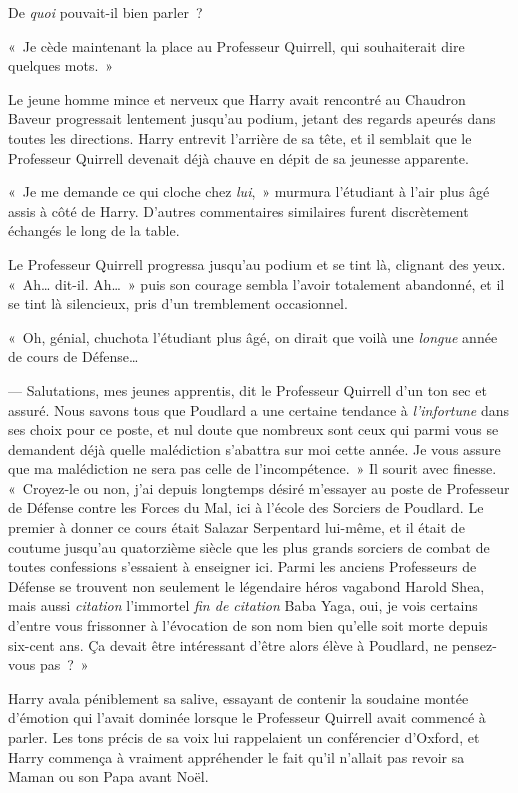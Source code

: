 De \emph{quoi} pouvait-il bien parler~?

«~Je cède maintenant la place au Professeur Quirrell, qui souhaiterait dire quelques mots.~»

Le jeune homme mince et nerveux que Harry avait rencontré au Chaudron Baveur progressait lentement jusqu'au podium, jetant des regards apeurés dans toutes les directions. Harry entrevit l'arrière de sa tête, et il semblait que le Professeur Quirrell devenait déjà chauve en dépit de sa jeunesse apparente.

«~Je me demande ce qui cloche chez \emph{lui},~» murmura l'étudiant à l'air plus âgé assis à côté de Harry. D'autres commentaires similaires furent discrètement échangés le long de la table.

Le Professeur Quirrell progressa jusqu'au podium et se tint là, clignant des yeux. «~Ah… dit-il. Ah…~» puis son courage sembla l'avoir totalement abandonné, et il se tint là silencieux, pris d'un tremblement occasionnel.

«~Oh, génial, chuchota l'étudiant plus âgé, on dirait que voilà une \emph{longue} année de cours de Défense…

--- Salutations, mes jeunes apprentis, dit le Professeur Quirrell d'un ton sec et assuré. Nous savons tous que Poudlard a une certaine tendance à \emph{l'infortune} dans ses choix pour ce poste, et nul doute que nombreux sont ceux qui parmi vous se demandent déjà quelle malédiction s'abattra sur moi cette année. Je vous assure que ma malédiction ne sera pas celle de l'incompétence.~» Il sourit avec finesse. «~Croyez-le ou non, j'ai depuis longtemps désiré m'essayer au poste de Professeur de Défense contre les Forces du Mal, ici à l'école des Sorciers de Poudlard. Le premier à donner ce cours était Salazar Serpentard lui-même, et il était de coutume jusqu'au quatorzième siècle que les plus grands sorciers de combat de toutes confessions s'essaient à enseigner ici. Parmi les anciens Professeurs de Défense se trouvent non seulement le légendaire héros vagabond Harold Shea, mais aussi \emph{citation} l'immortel \emph{fin de citation} Baba Yaga, oui, je vois certains d'entre vous frissonner à l'évocation de son nom bien qu'elle soit morte depuis six-cent ans. Ça devait être intéressant d'être alors élève à Poudlard, ne pensez-vous pas~?~»

Harry avala péniblement sa salive, essayant de contenir la soudaine montée d'émotion qui l'avait dominée lorsque le Professeur Quirrell avait commencé à parler. Les tons précis de sa voix lui rappelaient un conférencier d'Oxford, et Harry commença à vraiment appréhender le fait qu'il n'allait pas revoir sa Maman ou son Papa avant Noël.


